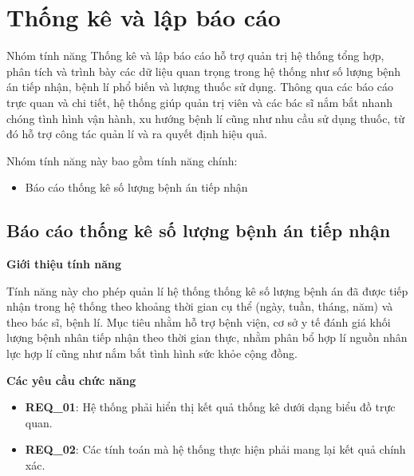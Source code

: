 \section{Thống kê và lập báo cáo}

Nhóm tính năng Thống kê và lập báo cáo hỗ trợ quản trị hệ thống tổng hợp, phân tích và trình bày các dữ liệu quan trọng trong hệ thống như số lượng bệnh án tiếp nhận, bệnh lí phổ biến và lượng thuốc sử dụng. Thông qua các báo cáo trực quan và chi tiết, hệ thống giúp quản trị viên và các bác sĩ nắm bắt nhanh chóng tình hình vận hành, xu hướng bệnh lí cũng như nhu cầu sử dụng thuốc, từ đó hỗ trợ công tác quản lí và ra quyết định hiệu quả.

Nhóm tính năng này bao gồm tính năng chính:
\begin{itemize}
  \item Báo cáo thống kê số lượng bệnh án tiếp nhận
\end{itemize}

\subsection{Báo cáo thống kê số lượng bệnh án tiếp nhận}

\noindent \textbf{Giới thiệu tính năng}

Tính năng này cho phép quản lí hệ thống thống kê số lượng bệnh án đã được tiếp nhận trong hệ thống theo khoảng thời gian cụ thể (ngày, tuần, tháng, năm) và theo bác sĩ, bệnh lí. Mục tiêu nhằm hỗ trợ bệnh viện, cơ sở y tế đánh giá khối lượng bệnh nhân tiếp nhận theo thời gian thực, nhằm phân bổ hợp lí nguồn nhân lực hợp lí cũng như nắm bắt tình hình sức khỏe cộng đồng.

\noindent \textbf{Các yêu cầu chức năng}

\begin{itemize}
  \item \textbf{REQ\_01}: Hệ thống phải hiển thị kết quả thống kê dưới dạng biểu đồ trực quan.
  \item \textbf{REQ\_02}: Các tính toán mà hệ thống thực hiện phải mang lại kết quả chính xác.
\end{itemize}

